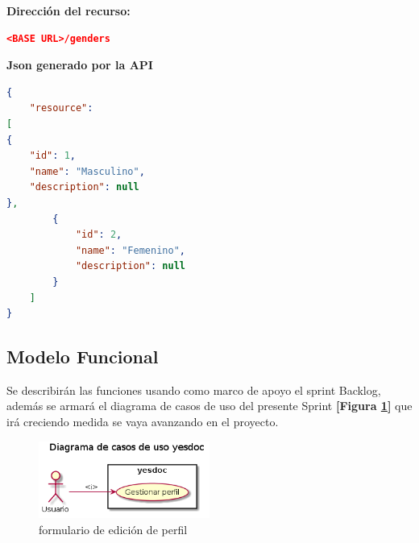     \textbf{Dirección del recurso:}
    \begin{lstlisting}[language=json,firstnumber=1]
    <BASE URL>/genders
    \end{lstlisting}

    \textbf{Json generado por la API}    
        \begin{lstlisting}[language=json,firstnumber=1]
{
    "resource": 
[
{
    "id": 1,
    "name": "Masculino",
    "description": null
},
        {
            "id": 2,
            "name": "Femenino",
            "description": null
        }
    ]
}
        \end{lstlisting}

\subsection{Modelo Funcional}
Se describirán las funciones usando como marco de apoyo el sprint Backlog, además se armará el diagrama de casos de uso del presente Sprint \textbf{[Figura \ref{1-caso_de_uso}]} que irá creciendo  medida se vaya avanzando en el proyecto.
    \begin{figure}[h]
        \centering
        \includegraphics[width=0.5\textwidth]{img/tp1_parte2/1-caso_de_uso}
        \caption{formulario de edición de perfil}
		\label{1-caso_de_uso}
    \end{figure}
